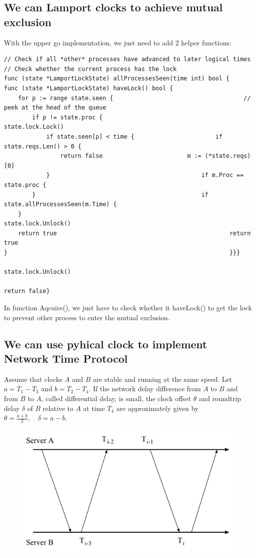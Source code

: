 \documentclass[acmlarge]{acmart}
\begin{document}
\subsection{We can Lamport clocks to achieve mutual exclusion}
With the upper go implementation, we just need to add 2 helper functions:
\begin{lstlisting}
// Check if all *other* processes have advanced to later logical times // Check whether the current process has the lock     
func (state *LamportLockState) allProcessesSeen(time int) bool {       func (state *LamportLockState) haveLock() bool {     
	for p := range state.seen {                                 	// peek at the head of the queue                           
		if p != state.proc {                                  	state.lock.Lock()                       
			if state.seen[p] < time {                     	if state.reqs.Len() > 0 {                             
				return false                      	m := (*state.reqs)[0]        
			}                                   		if m.Proc == state.proc {     
		}                                   			if state.allProcessesSeen(m.Time) {
	}                                  	                    	state.lock.Unlock() 
	return true                        	                    	return true               
}                                                      			}}}
                                                               		state.lock.Unlock()
                                                               		return false}
\end{lstlisting}

In function Aqcuire(), we just have to check whether it haveLock() to get the lock to prevent other process to enter the mutual exclusion.
\subsection{We can use pyhical clock to implement Network Time Protocol}
Assume that clocks $A$ and $B$ are stable and running at the same speed. Let $a=T_{1}-T_{3}$ and $b=T_{2}-T_{4}$. If the network delay difference from $A$ to $B$ and from $B$ to $A$, called differential delay, is small, the clock offset $\theta$ and roundtrip delay $\delta$ of $B$ relative to $A$ at time $T_{4}$ are approximately given by $\theta=\frac{a+b}{2}, \quad \delta=a-b$.
\begin{figure}[h]
  \centering
  \includegraphics[width=0.3\linewidth]{ntp.png}
  \caption{}
\end{figure}
\end{document}
